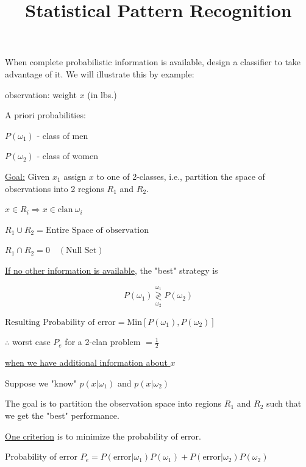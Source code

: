 \documentclass[fleqn]{article}
\title{Statistical Pattern Recognition}
\author{}
\date{}
\newcommand{\decisionbound}{\overset{\omega_1}{\underset{\omega_2}{\gtrless}}}
\newcommand{\zerodisplayskip}{
	\setlength{\abovedisplayskip}{0pt}%
	\setlength{\belowdisplayskip}{0pt}%
	\setlength{\abovedisplayshortskip}{0pt}%
	\setlength{\belowdisplayshortskip}{0pt}%
	\setlength{\mathindent}{0pt}}
\begin{document}
	\offinterlineskip
	\setlength{\lineskip}{12pt}
	\zerodisplayskip
	\maketitle
	
	When complete probabilistic information is available, design a classifier to take advantage of it. We will illustrate this by example:
	
	observation: weight $x$ (in lbs.)
	
	A priori probabilities:
	
	$P(\omega_1)$ - class of men
	
	$P(\omega_2)$ - class of women
	
	\underline{Goal:} Given $x_1$ assign $x$ to one of 2-classes, i.e., partition the space of observations into 2 regions $R_1$ and $R_2$.
	
	$x \in R_i \Rightarrow x \in \text{clan}\ \omega_i$
	
	$R_1 \cup R_2 = \text{Entire Space of observation}$
	
	$R_1 \cap R_2 = 0 \quad(\text{Null Set})$
	
	\underline{If no other information is available}, the "best" strategy is
	
	\begin{equation*}
		P(\omega_1) \decisionbound P(\omega_2)
	\end{equation*}
	
	$\text{Resulting Probability of error} = \text{Min}[P(\omega_1), P(\omega_2)]$ 
	
	$\therefore$ worst case $P_e$ for a 2-clan problem $ = \frac{1}{2}$
	
	\underline{when we have additional information about $x$}
	
	Suppose we "know" $p(x|\omega_1)$ and $p(x|\omega_2)$
	
	The goal is to partition the observation space into regions $R_1$ and $R_2$ such that we get the "best" performance.
	
	\underline{One criterion} is to minimize the probability of error.
	
	Probability of error $P_e = P(\text{error}|\omega_1)P(\omega_1) + P(\text{error}|\omega_2)P(\omega_2)$
	
\end{document}

